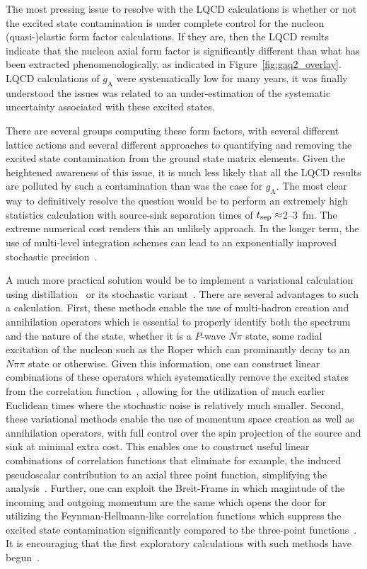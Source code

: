 The most pressing issue to  resolve with the LQCD calculations is whether or not the excited state contamination is under complete control for the nucleon (quasi-)elastic form factor calculations.
If they are, then the LQCD results indicate that the nucleon axial form factor is significantly different than what has been extracted phenomenologically, as indicated in Figure~\ref{fig:gaq2_overlay}.
 LQCD calculations of $g_{\mathrm{A}}$ were systematically low for many years,  it was finally understood the issues was related to an under-estimation of the systematic uncertainty associated with these excited states.

There are several groups computing these form factors, with several different lattice actions and several different approaches to quantifying and removing the excited state contamination from the ground state matrix elements.
Given the heightened awareness of this issue, it is much less likely that all the LQCD results are polluted by such a contamination than was the case for $g_{\mathrm{A}}$.
The most clear way to definitively resolve the question would be to perform an extremely high statistics calculation with source-sink separation times of $t_{\rm sep}\approx$2--3~fm.  The extreme numerical cost
renders this an unlikely approach.
In the longer term, the use of multi-level integration schemes can lead to an exponentially improved stochastic precision~\cite{Ce:2016idq}.

A much more practical solution would be to implement a variational calculation using distillation~\cite{HadronSpectrum:2009krc} or its stochastic variant~\cite{Morningstar:2011ka}.
There are several advantages to such a calculation.
First, these methods enable the use of multi-hadron creation and annihilation operators which is essential to properly identify both the spectrum and the nature of the state, whether it is a $P$-wave $N\pi$ state, some radial excitation of the nucleon such as the Roper which can prominantly decay to an $N\pi\pi$ state or otherwise.
Given this information, one can construct linear combinations of these operators which systematically remove the excited states from the correlation function~\cite{Blossier:2009kd}, allowing for the utilization of much earlier Euclidean times where the stochastic noise is relatively much smaller.
Second, these variational methods enable the use of momentum space creation as well as annihilation operators, with full control over the spin projection of the source and sink at minimal extra cost.
This enables one to construct useful linear combinations of correlation functions that eliminate for example, the induced pseudoscalar contribution to an axial three point function, simplifying the analysis~\cite{Meyer:2017ddy}.
Further, one can exploit the Breit-Frame in which magintude of the incoming and outgoing momentum are the same which opens the door for utilizing the Feynman-Hellmann-like correlation functions which suppress the excited state contamination significantly compared to the three-point functions~\cite{He:2021yvm}.
It is encouraging that the first exploratory calculations with such methods have begun~\cite{Egerer:2018xgu,Barca:2021iak}.

